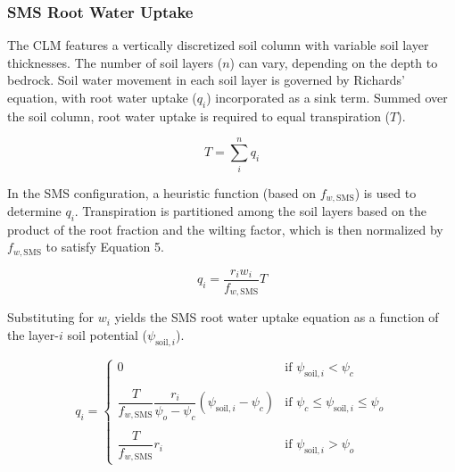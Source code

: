 \documentclass[draft,linenumbers]{agujournal}
\begin{document}
\subsubsection{SMS Root Water Uptake}
\label{sect:smsrwu}
    The CLM features a vertically discretized soil column with variable soil layer thicknesses.
    The number of soil layers ($n$) can vary, depending on the depth to bedrock.
    Soil water movement in each soil layer is governed by Richards' equation, with root water uptake ($q_i$) incorporated as a sink term.
    Summed over the soil column, root water uptake is required to equal transpiration ($T$).

    \begin{linenomath*}
    \begin{equation}
    T = \sum^n_i{q_i}
    \end{equation}
    \end{linenomath*} 
    
    In the SMS configuration, a heuristic function (based on $f_{w,\text{SMS}}$) is used to determine $q_i$.
    Transpiration is partitioned among the soil layers based on the product of the root fraction and the wilting factor, which is then normalized by $f_{w,\text{SMS}}$ to satisfy Equation 5.
    \begin{linenomath*}
    \begin{equation}
    \label{bt:4}
    q_i = \dfrac{r_i w_i}{f_{w,\text{SMS}}}T
    \end{equation}
    \end{linenomath*}
    
    Substituting for $w_i$ yields the SMS root water uptake equation as a function of the layer-$i$ soil potential ($\psi_{\text{soil},i}$).
    
    \begin{linenomath*}
    \begin{equation}
    q_i =
    \begin{cases}
    \label{eq:btrwu}
    0    & \text{if } \psi_{\text{soil},i}<\psi_{c}  \\
    \\[1pt]
        \dfrac{T}{f_{w,\text{SMS}}} \dfrac{r_i}{\psi_{o}-\psi_{c}} \left(\psi_{\text{soil},i}-\psi_{c} \right)     & \text{if } \psi_{c} \le \psi_{\text{soil},i} \le \psi_{o} \\
    \\[1pt]
    \dfrac{T}{f_{w,\text{SMS}}} r_i    & \text{if } \psi_{\text{soil},i} > \psi_{o}
    \end{cases}
    \end{equation}
    \end{linenomath*}
    
\end{document}

